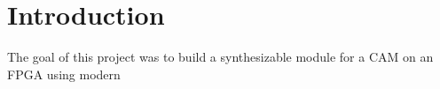 \section{Introduction}
The goal of this project was to build a synthesizable module for a CAM on an FPGA using modern 